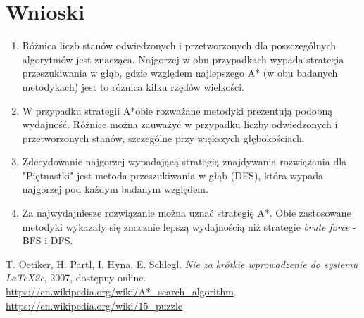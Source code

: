 \documentclass{classrep}
\begin{document}
\newpage
\section{Wnioski}
\begin{enumerate}
\item Różnica liczb stanów odwiedzonych i przetworzonych dla poszczególnych algorytmów jest znacząca. Najgorzej w obu przypadkach wypada strategia przeszukiwania w głąb, gdzie względem najlepszego A* (w obu badanych metodykach) jest to różnica kilku rzędów wielkości.
\item W przypadku strategii A*obie rozważane metodyki prezentują podobną wydajność. Różnice można zauważyć w przypadku liczby odwiedzonych i przetworzonych stanów, szczególne przy większych głębokościach.
\item Zdecydowanie najgorzej wypadającą strategią znajdywania rozwiązania dla "Piętnastki" jest metoda przeszukiwania w głąb (DFS), która wypada najgorzej pod każdym badanym względem.
\item Za najwydajniesze rozwiązanie można uznać strategię A*. Obie zastosowane metodyki wykazały się znacznie lepszą wydajnością niż strategie \textit{brute force} - BFS i DFS.
\end{enumerate}

\begin{thebibliography}{0}
   T. Oetiker, H. Partl, I. Hyna, E. Schlegl.
    \textsl{Nie za krótkie wprowadzenie do systemu \LaTeX2e}, 2007, dostępny
    online.
   \url{https://en.wikipedia.org/wiki/A*_search_algorithm}
   \url{https://en.wikipedia.org/wiki/15_puzzle}
  
\end{thebibliography}
\end{document}
